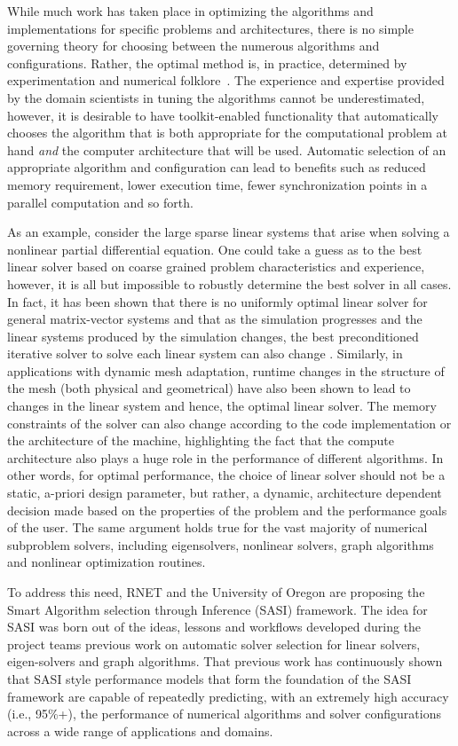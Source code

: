 While much work has taken place in optimizing the algorithms and implementations for specific problems and architectures, there is no simple governing theory for choosing between the numerous algorithms and configurations. Rather, the optimal method is, in practice, determined by experimentation and numerical folklore~\cite{EijkFuen2010:multistage}. The experience and expertise provided by the domain scientists in tuning the algorithms cannot be underestimated, however, it is desirable to have toolkit-enabled functionality that automatically chooses the algorithm that is both appropriate for the computational problem at hand \emph{and} the computer architecture that will be used. Automatic selection of an appropriate algorithm and configuration can lead to benefits such as reduced memory requirement, lower execution time, fewer synchronization points in a parallel computation and so forth. 

As an example, consider the large sparse linear systems that arise when solving a nonlinear partial differential equation. One could take a guess as to the best linear solver based on coarse grained problem characteristics and experience, however, it is all but impossible to robustly determine the best solver in all cases. In fact, it has been shown that there is no uniformly optimal linear solver for general matrix-vector systems and that as the simulation progresses and the linear systems produced by the simulation changes, the best preconditioned iterative solver to solve each linear system can also change \cite{Eller2012}. Similarly, in applications with dynamic mesh adaptation, runtime changes in the structure of the mesh (both physical and geometrical) have also been shown to lead to changes in the linear system and hence, the optimal linear solver. The memory constraints of the solver can also change according to the code implementation or the architecture of the machine, highlighting the fact that the compute architecture also plays a huge role in the performance of different algorithms. In other words, for optimal performance, the choice of linear solver should not be a static, a-priori design parameter, but rather, a dynamic, architecture dependent decision made based on the properties of the problem and the performance goals of the user. The same argument holds true for the vast majority of numerical subproblem solvers, including eigensolvers, nonlinear solvers, graph algorithms and nonlinear optimization routines. 

To address this need, RNET and the University of Oregon are proposing the Smart Algorithm selection through Inference (SASI) framework. The idea for SASI was born out of the ideas, lessons and workflows developed during the project teams previous work on automatic solver selection for linear solvers, eigen-solvers and graph algorithms. That previous work has continuously shown that SASI style performance models that form the foundation of the SASI framework are capable of repeatedly predicting, with an extremely high accuracy (i.e., 95\%+), the performance of numerical algorithms and solver configurations across a wide range of applications and domains.

